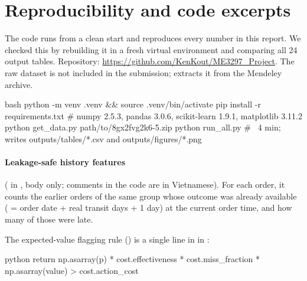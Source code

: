 \section{Reproducibility and code excerpts}
\label{app:code}

The code runs from a clean start and reproduces every number in this report. We checked this
by rebuilding it in a fresh virtual environment and comparing all 24 output tables. Repository:
\url{https://github.com/KenKout/ME3297_Project}. The raw dataset is not included in the
submission;  extracts it from the Mendeley archive.

\begin{code}{bash}
python -m venv .venv && source .venv/bin/activate
pip install -r requirements.txt        # numpy 2.5.3, pandas 3.0.6, scikit-learn 1.9.1, matplotlib 3.11.2
python get_data.py path/to/8gx2fvg2k6-5.zip
python run_all.py                      # ~4 min; writes outputs/tables/*.csv and outputs/figures/*.png
\end{code}

\paragraph{Leakage-safe history features} ( in ,
body only; comments in the code are in Vietnamese). For each order, it counts the earlier orders
of the same group whose outcome was already available ( = order date + real
transit days + 1 day) at the current order time, and how many of those were late.


The expected-value flagging rule () is a single line in  in
:

\begin{code}{python}
return np.asarray(p) * cost.effectiveness * cost.miss_fraction * np.asarray(value) > cost.action_cost
\end{code}
